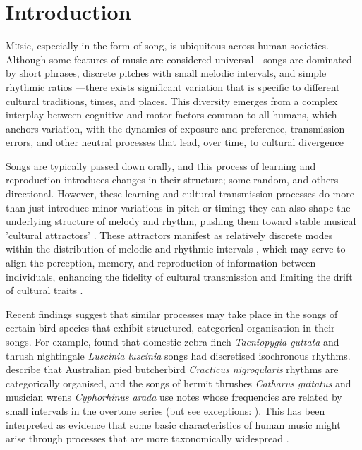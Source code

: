 \section{Introduction}

\lettrine[lines=2]Music, especially in the form of song, is ubiquitous across human societies. Although some features of music are considered universal---songs are dominated by short phrases, discrete pitches with small melodic intervals, and simple rhythmic ratios \autocite{mehr2019, savage2015}---there exists significant variation that is specific to different cultural traditions, times, and places. This diversity emerges from a complex interplay between cognitive and motor factors common to all humans, which anchors variation, with the dynamics of exposure and preference, transmission errors, and other neutral processes that lead, over time, to cultural divergence \autocite{tchernichovski2017,verhoef2021,tierney2011,savage2019,savage2019} 

Songs are typically passed down orally, and this process of learning and reproduction introduces changes in their structure; some random, and others directional. However, these learning and cultural transmission processes do more than just introduce minor variations in pitch or timing; they can also shape the underlying structure of melody and rhythm, pushing them toward stable musical 'cultural attractors' \autocite{claidiere2007, buskell2017}. These attractors manifest as relatively discrete modes within the distribution of melodic and rhythmic intervals \autocite{anglada-tort2023, verhoef2021, jacoby2021}, which may serve to align the perception, memory, and reproduction of information between individuals, enhancing the fidelity of cultural transmission and limiting the drift of cultural traits \autocite{anglada-tort2023, heyes2018a, feher2009, saldana2019, trehub2015, falandays2022}.

Recent findings suggest that similar processes may take place in the songs of certain bird species that exhibit structured, categorical organisation in their songs. For example, \textcite{roeske2020} found that domestic zebra finch \textit{Taeniopygia guttata} and thrush nightingale \textit{Luscinia luscinia} songs had discretised isochronous rhythms. \textcite{xing2022} describe that Australian pied butcherbird \textit{Cracticus nigrogularis} rhythms are categorically organised, and the songs of hermit thrushes \textit{Catharus guttatus} \autocite{doolittle2014} and musician wrens \textit{Cyphorhinus arada} \autocite{doolittle2012} use notes whose frequencies are related by small intervals in the overtone series (but see exceptions: \cite{araya-salas2012, dobson1977}). This has been interpreted as evidence that some basic characteristics of human music might arise through processes that are more taxonomically widespread \autocite{doolittle2014}.

